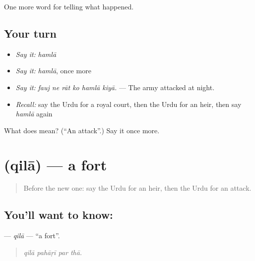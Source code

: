 \begin{grammarlens}[title={What you've built}]
One more word for telling what happened.
\end{grammarlens}

\subsection*{Your turn}
\begin{itemize}
\raggedright
  \item \emph{Say it:} \emph{hamlā}
  \item \emph{Say it:} \emph{hamlā}, once more
  \item \emph{Say it:} \emph{fauj ne rāt ko hamlā kiyā.} — The army attacked at night.
  \item \emph{Recall:} say the Urdu for a royal court, then the Urdu for an heir, then say \emph{hamlā} again
\end{itemize}

\begin{tcolorbox}[breakable,colback=teal!4,colframe=teal!35!black,title={Before you move on}]
What does  mean? (\textquotedblleft{}An attack\textquotedblright{}.) Say it once more.
\end{tcolorbox}
\section[\texorpdfstring{\ur{قلعہ} (qilā)}{قلعہ (qilā)}]{ (qilā) — a fort}

\label{lesson:UR-C309-qila}



\begin{quote}
Before the new one: say the Urdu for an heir, then the Urdu for an attack.
\end{quote}

\subsection*{You'll want to know: }
\textbf{} — \emph{qilā} — \textquotedblleft{}a fort\textquotedblright{}.

\begin{quote}
   
\end{quote}

\begin{quote}
\emph{qilā pahāṛī par thā.}
\end{quote}

